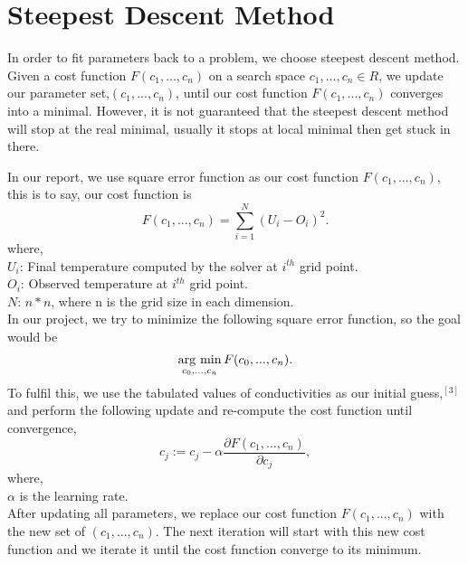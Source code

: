 \documentclass[10pt,a4paper]{report}
\newcommand{\argmin}{\mathop{\rm arg~min}\limits}
\begin{document}
\section{Steepest Descent Method}

In order to fit parameters back to a problem, we choose steepest descent method. Given a cost function $F(c_1,...,c_n)$ on a search space $c_1,...,c_n \in R$, we update our parameter set,$(c_1,...,c_n)$, until our cost function $F(c_1,...,c_n)$ converges into a minimal. However, it is not guaranteed that the steepest descent method will stop at the real minimal, usually it stops at local minimal then get stuck in there.

In our report, we use square error function as our cost function $F(c_1,...,c_n)$, this is to say, our cost function is
\begin{equation}
 F(c_1,...,c_n)= \sum\limits_{i=1}^N (U_i-O_i)^2          .
\end{equation} \[\] 
where,\\
$U_i$: Final temperature computed by the solver at $i^{th}$ grid point.\\
$O_i$: Observed temperature at $i^{th}$ grid point.\\
$N$: $n*n$, where n is the grid size in each dimension.\\

In our project, we try to minimize the following square error function, so the goal would be
\begin{equation*}
\argmin_{c_0,...,c_n}F(c_0,...,c_n).
\end{equation*} 
To fulfil this, we use the tabulated values of conductivities as our initial guess,$^{[3]}$ and perform the following update and re-compute the cost function until convergence,
\begin{equation}
c_j := c_j - \alpha{\frac{\partial F(c_1,...,c_n)}{\partial c_j}},
\end{equation}
where,\\
 $\alpha$ is the learning rate. \\
 
After updating all parameters, we replace our cost function $F(c_1,...,c_n)$ with the new set of $(c_1,...,c_n)$. The next iteration will start with this new cost function and we iterate it until the cost function converge to its minimum. 
\end{document}
